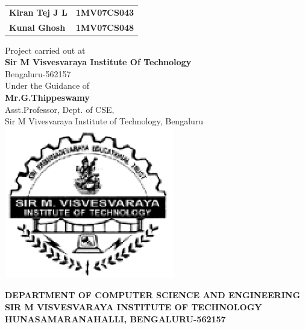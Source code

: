 \documentclass{article}
\newcommand{\tab}{\hspace*{8 cm}}
\begin{document}
\begin{center}
\begin{table}[h]
\begin{tabular}{lr}
\normalsize\textbf{Kiran Tej J L}  \tab & \textbf{1MV07CS043}  \\
\normalsize\textbf{Kunal Ghosh} \tab &  \textbf{1MV07CS048}   \\ 
\end{tabular}
\end{table}
\vspace{1mm}
\normalsize{Project carried out at} \\
\vspace{0.5mm}
\large\textbf{Sir M Visvesvaraya Institute Of Technology}\\
\vspace{0.5mm}
\normalsize{Bengaluru-562157}\\
\vspace{2mm}
\normalsize{Under the Guidance of\\}
\vspace{1mm}
\normalsize\textbf{Mr.G.Thippeswamy}\\
\vspace{0.5mm}
\small{Asst.Professor, Dept. of CSE,\\}
\vspace{0.5mm}
\normalsize{Sir M Vivesvaraya Institute of Technology, Bengaluru\\}
\vspace{1mm}
\includegraphics{mspicture1.eps}

\vspace{1mm}

\normalsize\textbf{DEPARTMENT OF COMPUTER SCIENCE AND ENGINEERING}\\
\vspace{1mm}
\normalsize\textbf{SIR M VISVESVARAYA INSTITUTE OF TECHNOLOGY}\\
\vspace{1mm}
\small\textbf{HUNASAMARANAHALLI, BENGALURU-562157}\\

\end{center}
\end{document}
